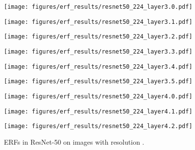 \documentclass{article}
\begin{document}
\begin{figure}[tb]
  \begin{minipage}[t]{0.13\hsize}
    \centering
    \texttt{[image: figures/erf\_results/resnet50\_224\_layer3.0.pdf]}
    \label{figure:erf_resnet:7}
  \end{minipage}
  \begin{minipage}[t]{0.13\hsize}
    \centering
    \texttt{[image: figures/erf\_results/resnet50\_224\_layer3.1.pdf]}
    \label{figure:erf_resnet:8}
  \end{minipage}
  \begin{minipage}[t]{0.13\hsize}
    \centering
    \texttt{[image: figures/erf\_results/resnet50\_224\_layer3.2.pdf]}
    \label{figure:erf_resnet:9}
  \end{minipage}
  \begin{minipage}[t]{0.13\hsize}
    \centering
    \texttt{[image: figures/erf\_results/resnet50\_224\_layer3.3.pdf]}
    \label{figure:erf_resnet:10}
  \end{minipage}
  \begin{minipage}[t]{0.13\hsize}
    \centering
    \texttt{[image: figures/erf\_results/resnet50\_224\_layer3.4.pdf]}
    \label{figure:erf_resnet:11}
  \end{minipage}
  \begin{minipage}[t]{0.13\hsize}
    \centering
    \texttt{[image: figures/erf\_results/resnet50\_224\_layer3.5.pdf]}
    \label{figure:erf_resnet:12}
  \end{minipage}
  \begin{minipage}[t]{0.13\hsize}
    \centering
    \texttt{[image: figures/erf\_results/resnet50\_224\_layer4.0.pdf]}
    \label{figure:erf_resnet:13}
  \end{minipage}
  \begin{minipage}[t]{0.13\hsize}
    \centering
    \texttt{[image: figures/erf\_results/resnet50\_224\_layer4.1.pdf]}
    \label{figure:erf_resnet:14}
  \end{minipage}
  \begin{minipage}[t]{0.13\hsize}
    \centering
    \texttt{[image: figures/erf\_results/resnet50\_224\_layer4.2.pdf]}
    \label{figure:erf_resnet:15}
  \end{minipage}
  \caption{ERFs in ResNet-50 \cite{he2016deep} on images with resolution .}
  \label{figure:erf_resnet}
\end{figure} 
\end{document}
